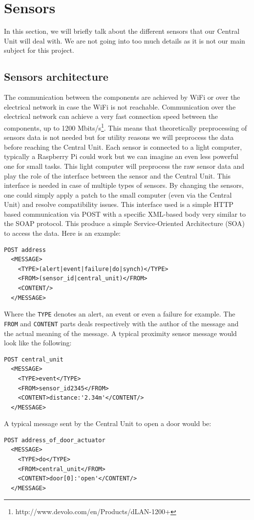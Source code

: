 \documentclass{acm_proc_article-sp}
\begin{document}
\section{Sensors}\label{sensors_section}
In this section, we will briefly talk about the different sensors that our Central Unit will deal with. 
We are not going into too much details as it is not our main subject for this project.
\subsection{Sensors architecture}
The communication between the components are achieved by WiFi or over the electrical network in case the WiFi is not reachable. 
Communication over the electrical network can achieve a very fast connection speed between the components, up to 1200 Mbits/s\footnote{http://www.devolo.com/en/Products/dLAN-1200+}. 
This means that theoretically preprocessing of sensors data is not needed but for utility reasons we will preprocess the data before reaching the Central Unit.
Each sensor is connected to a light computer, typically a Raspberry Pi could work but we can imagine an even less powerful one for small tasks. 
This light computer will preprocess the raw sensor data and play the role of the interface between the sensor and the Central Unit. 
This interface is needed in case of multiple types of sensors. By changing the sensors, one could simply apply a patch to the small computer (even via the Central Unit) and resolve compatibility issues. 
This interface used is a simple HTTP based communication via POST with a specific XML-based body very similar to the SOAP protocol. 
This produce a simple Service-Oriented Architecture (SOA) to access the data. 
Here is an example:
\begin{verbatim}
POST address 
  <MESSAGE>
    <TYPE>(alert|event|failure|do|synch)</TYPE>
    <FROM>(sensor_id|central_unit)</FROM>
    <CONTENT/>
  </MESSAGE>
\end{verbatim}
Where the \texttt{TYPE} denotes an alert, an event or even a failure for example. 
The \texttt{FROM} and \texttt{CONTENT} parts deals respectively with the author of the message and the actual meaning of the message. 
A typical proximity sensor message would look like the following:
\begin{verbatim}
POST central_unit 
  <MESSAGE>
    <TYPE>event</TYPE>
    <FROM>sensor_id2345</FROM>
    <CONTENT>distance:'2.34m'</CONTENT/>
  </MESSAGE>
\end{verbatim}
A typical message sent by the Central Unit to open a door would be:
\begin{verbatim}
POST address_of_door_actuator
  <MESSAGE>
    <TYPE>do</TYPE>
    <FROM>central_unit</FROM>
    <CONTENT>door[0]:'open'</CONTENT/>
  </MESSAGE> 
\end{verbatim}
\end{document}
